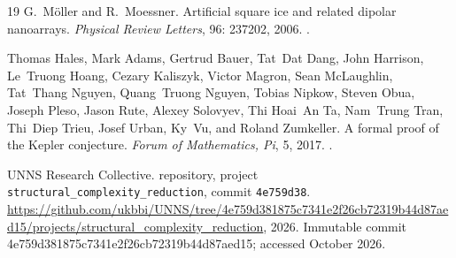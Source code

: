 \documentclass[11pt,a4paper]{article}
\theoremstyle{plain}
\theoremstyle{definition}
\theoremstyle{remark}
\begin{document}
\begin{thebibliography}{19}
G.~M{\"o}ller and R.~Moessner.
\newblock Artificial square ice and related dipolar nanoarrays.
\newblock \emph{Physical Review Letters}, 96: 237202, 2006.
\newblock {}.

Thomas Hales, Mark Adams, Gertrud Bauer, Tat~Dat Dang, John Harrison, Le~Truong
  Hoang, Cezary Kaliszyk, Victor Magron, Sean McLaughlin, Tat~Thang Nguyen,
  Quang~Truong Nguyen, Tobias Nipkow, Steven Obua, Joseph Pleso, Jason Rute,
  Alexey Solovyev, Thi Hoai~An Ta, Nam~Trung Tran, Thi~Diep Trieu, Josef Urban,
  Ky~Vu, and Roland Zumkeller.
\newblock A formal proof of the {K}epler conjecture.
\newblock \emph{Forum of Mathematics, Pi}, 5, 2017.
\newblock {}.

{UNNS Research Collective}.
 repository, project
  \texttt{structural\_complexity\_reduction}, commit \texttt{4e759d38}.
\newblock
  \url{https://github.com/ukbbi/UNNS/tree/4e759d381875c7341e2f26cb72319b44d87aed15/projects/structural_complexity_reduction},
  2026.
\newblock Immutable commit 4e759d381875c7341e2f26cb72319b44d87aed15; accessed
  October 2026.

\end{thebibliography}
\end{document}
